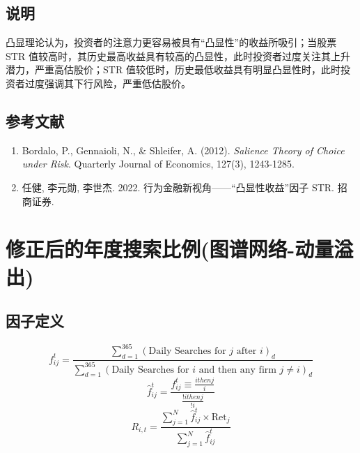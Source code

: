 \documentclass{article}
\begin{document}
\subsection{说明}
凸显理论认为，投资者的注意力更容易被具有“凸显性”的收益所吸引；当股票 \( \mathrm{STR} \) 值较高时，其历史最高收益具有较高的凸显性，此时投资者过度关注其上升潜力，严重高估股价；\( \mathrm{STR} \) 值较低时，历史最低收益具有明显凸显性时，此时投资者过度强调其下行风险，严重低估股价。

\subsection{参考文献}
\begin{enumerate}
    \item Bordalo, P., Gennaioli, N., \& Shleifer, A. (2012). \textit{Salience Theory of Choice under Risk}. Quarterly Journal of Economics, 127(3), 1243-1285.
    \item 任健, 李元勋, 李世杰. 2022. 行为金融新视角——“凸显性收益”因子 STR. 招商证券.
\end{enumerate}

\section{修正后的年度搜索比例(图谱网络-动量溢出)}

\subsection{因子定义}

\begin{equation}
    f_{ij}^t = \frac{\sum_{d=1}^{365} (\text{Daily Searches for } j \text{ after } i)_d}{\sum_{d=1}^{365} (\text{Daily Searches for } i \text{ and then any firm } j \neq i)_d}
\end{equation}
\begin{equation}
    \hat{f}_{ij}^t = \frac{f_{ij}^t \equiv{\frac{ithenj}{i}}}{\frac{!ithenj}{!i}}
\end{equation}
\begin{equation}
    R_{i,t} = \frac{\sum_{j=1}^{N} \hat{f}_{ij}^t \times \mathrm{Ret}_j}{\sum_{j=1}^{N} \hat{f}_{ij}^t}
\end{equation}
\end{document}
